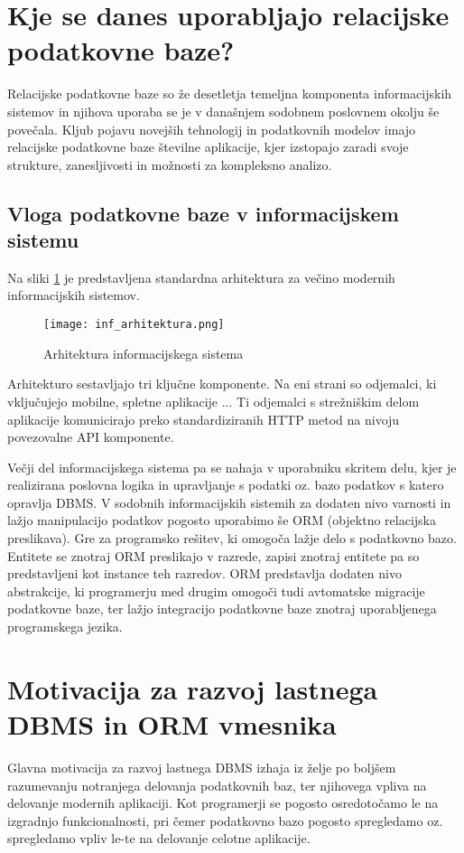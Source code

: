 \documentclass[a4paper,12pt,openright]{book}
\begin{document}
    \section{Kje se danes uporabljajo relacijske podatkovne baze?}

    Relacijske podatkovne baze so že desetletja temeljna komponenta informacijskih sistemov in njihova uporaba se je v današnjem sodobnem poslovnem okolju še povečala. Kljub pojavu novejših tehnologij in podatkovnih modelov imajo relacijske podatkovne baze številne aplikacije, kjer izstopajo zaradi svoje strukture, zanesljivosti in možnosti za kompleksno analizo.

    \newpage
    \subsection{Vloga podatkovne baze v informacijskem sistemu}

    Na sliki \ref{infsistem} je predstavljena standardna arhitektura za večino modernih informacijskih sistemov.

    \begin{figure}[h]
        \centerline{\texttt{[image: inf\_arhitektura.png]}}
        \caption{Arhitektura informacijskega sistema}
        \label{infsistem}
    \end{figure}

    \noindent
    Arhitekturo sestavljajo tri ključne komponente. Na eni strani so odjemalci, ki vključujejo mobilne, spletne aplikacije  ... Ti odjemalci s strežniškim delom aplikacije komunicirajo preko standardiziranih HTTP metod na nivoju povezovalne API komponente.

    Večji del informacijskega sistema pa se nahaja v uporabniku skritem delu, kjer je realizirana poslovna logika in upravljanje s podatki oz. bazo podatkov s katero opravlja DBMS. V sodobnih informacijskih sistemih za dodaten nivo varnosti in lažjo manipulacijo podatkov pogosto uporabimo še ORM (objektno relacijska preslikava). Gre za programsko rešitev, ki omogoča lažje delo s podatkovno bazo. Entitete se znotraj ORM preslikajo v razrede, zapisi znotraj entitete pa so predstavljeni kot instance teh razredov. ORM predstavlja dodaten nivo abstrakcije, ki programerju med drugim omogoči tudi avtomatske migracije podatkovne baze, ter lažjo integracijo podatkovne baze znotraj uporabljenega programskega jezika.

    \section{Motivacija za razvoj lastnega DBMS in ORM vmesnika}
    Glavna motivacija za razvoj lastnega DBMS izhaja iz želje po boljšem razumevanju notranjega delovanja podatkovnih baz, ter njihovega vpliva na delovanje modernih aplikaciji. Kot programerji se pogosto osredotočamo le na izgradnjo funkcionalnosti, pri čemer podatkovno bazo pogosto spregledamo oz. spregledamo vpliv le-te na delovanje celotne aplikacije.
    
\end{document}
